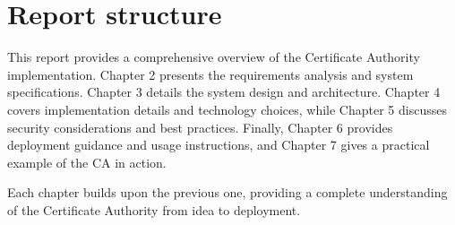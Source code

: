 \section{Report structure}

This report provides a comprehensive overview of the Certificate Authority implementation. 
Chapter 2 presents the requirements analysis and system specifications. 
Chapter 3 details the system design and architecture. 
Chapter 4 covers implementation details and technology choices, while Chapter 5 discusses security 
considerations and best practices. 
Finally, Chapter 6 provides deployment guidance and usage instructions, and Chapter 7
gives a practical example of the CA in action.

Each chapter builds upon the previous one, providing a complete understanding of the Certificate 
Authority from idea to deployment.
